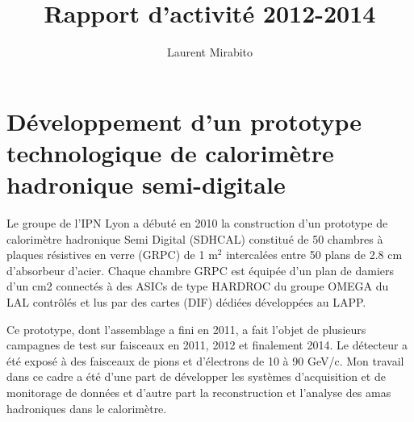 \documentclass[9pt,french]{article}
\title{\textbf{Rapport d'activit\'e 2012-2014}}
\author{Laurent Mirabito}
\date{}
\begin{document}
\maketitle

\section*{D\'eveloppement d'un prototype technologique de calorim\`etre hadronique semi-digitale}

Le groupe de l'IPN Lyon a d\'ebut\'e en 2010 la construction d'un prototype de
calorim\`etre hadronique Semi Digital (SDHCAL) constitu\'e de 50 chambres \`a plaques r\'esistives en verre (GRPC) de 1 m$^2$ intercal\'ees entre 50 plans de 2.8 cm d'absorbeur d'acier. 
Chaque chambre GRPC est \'equip\'ee d'un plan de damiers d'un cm2 connect\'es \`a des ASICs de type
HARDROC du groupe OMEGA du LAL contrôl\'es et lus par des cartes (DIF) d\'edi\'ees d\'evelopp\'ees au LAPP.

Ce prototype, dont l'assemblage a fini en 2011, a fait l'objet de plusieurs campagnes de test sur faisceaux en 2011, 2012 et finalement 2014. Le d\'etecteur a \'et\'e expos\'e à des faisceaux de pions et d'\'electrons de 10 \`a 90 GeV/c. Mon travail dans ce cadre a \'et\'e d'une part de d\'evelopper les syst\`emes d'acquisition et de monitorage de donn\'ees et d'autre part la reconstruction et l'analyse des amas hadroniques dans le calorim\`etre.
\end{document}
